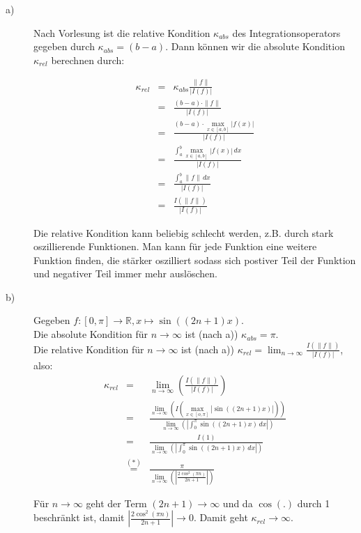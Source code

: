 \documentclass[11pt,a4paper,ngerman]{article}
\begin{document}
\begin{description}
\item[a)] Nach Vorlesung ist die relative Kondition $\kappa_{abs}$ des Integrationsoperators gegeben durch $\kappa_{abs} = (b-a)$. Dann können wir die absolute Kondition $\kappa_{rel}$ berechnen durch:

\begin{eqnarray*}
\kappa_{rel} &=& \kappa_{abs} \frac{\| f \| }{|I(f)|} \\
  &=&  \frac{(b-a) \cdot \| f \| }{|I(f)|} \\
  &=&  \frac{(b-a) \cdot \max_{x\in[a,b]}{|f(x)|} }{|I(f)|} \\
  &=&  \frac{\int_a^b \max_{x\in[a,b]}{|f(x)|} \, dx}{|I(f)|} \\
  &=&  \frac{\int_a^b \| f \| \, dx}{|I(f)|} \\
  &=&  \frac{I(\|f\|)}{|I(f)|} 
\end{eqnarray*}

Die relative Kondition kann beliebig schlecht werden, z.B. durch stark oszillierende Funktionen. Man kann für jede Funktion eine weitere Funktion finden, die stärker oszilliert sodass sich postiver Teil der Funktion und negativer Teil immer mehr auslöschen.

\item[b)] Gegeben $f: [0,\pi] \to \mathbb{R}, x \mapsto \sin((2n+1)x)$. \\
Die absolute Kondition für $n \to \infty$ ist (nach a)) $\kappa_{abs} = \pi$. \\
Die relative Kondition für $n \to \infty$ ist (nach a)) $\kappa_{rel} = \lim_{n \to \infty} \frac{I(\|f\|)}{|I(f)|}$, also:
\begin{eqnarray*}
\kappa_{rel} &=& \lim_{n \to \infty} \left(\frac{I(\|f\|)}{|I(f)|}\right) \\
  &=& \frac{\lim_{n \to \infty} \left( I(\max_{x\in[o,\pi]} {|\sin((2n+1)x)|}) \right)}{\lim_{n \to \infty} \left( |\int_0^\pi \sin((2n+1)x) \, dx| \right)} \\
  &=& \frac{I(1)}{\lim_{n \to \infty} \left( |\int_0^\pi \sin((2n+1)x) \, dx| \right)} \\
  &\stackrel{(*)}{=}& \frac{\pi}{\lim_{n \to \infty} \left( |\frac{2 \cos^2(\pi n)}{2n+1}| \right)} 
\end{eqnarray*}

Für $n\to \infty$ geht der Term $(2n+1) \to \infty$ und  da $\cos(.)$ durch 1 beschränkt ist, damit $|\frac{2 \cos^2(\pi n)}{2n+1}| \to 0$. Damit geht $\kappa_{rel} \to \infty$. \\


\end{description}
\end{document}
